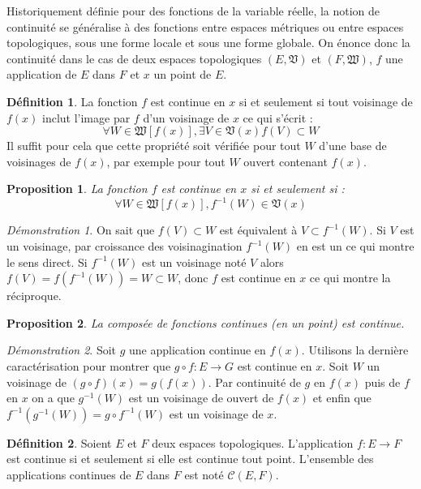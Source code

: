 \documentclass[a4paper, 11pt, french]{book}
\theoremstyle{plain} %
\newtheorem{proposition}{Proposition}
\theoremstyle{definition} %
\newtheorem{definition}{Définition}
\theoremstyle{remark} %
\newtheorem*{demonstration}{Démonstration}
\newcommand{\1}{\mathds{1}}
\newcommand{\inv}[1]{#1^{-1}}
\begin{document}
Historiquement définie pour des fonctions de la variable réelle, la notion de continuité se généralise à des fonctions entre espaces métriques ou entre espaces topologiques, sous une forme locale et sous une forme globale.
On énonce donc la continuité dans le cas de deux espaces topologiques $(E, \mathfrak{V})$ et $(F, \mathfrak{W})$, $f$ une application de $E$ dans $F$ et $x$ un point de $E$.

\begin{definition}
	La fonction $f$ est continue en $x$ si et seulement si tout voisinage de $f(x)$ inclut l'image par $f$ d'un voisinage de $x$ ce qui s'écrit :
	$$
	\forall W\in\mathfrak{W}[f(x)], \exists V\in\mathfrak{V}(x) f(V)\subset W
	$$
	Il suffit pour cela que cette propriété soit vérifiée pour tout $W$ d'une base de voisinages de $f(x)$, par exemple pour tout $W$ ouvert contenant $f(x)$. 
\end{definition}

\begin{proposition}
	La fonction $f$ est continue en $x$ si et seulement si :
	$$
	\forall W\in\mathfrak{W}[f(x)], \inv{f}(W)\in\mathfrak{V}(x)
	$$
\end{proposition}

\begin{demonstration}
	On sait que $f(V)\subset W$ est équivalent à $V\subset\inv{f}(W)$.
	Si $V$ est un voisinage, par croissance des voisinagination $\inv{f}(W)$ en est un ce qui montre le sens direct.
	Si $\inv{f}(W)$ est un voisinage noté $V$ alors $f(V)=f(\inv{f}(W))=W\subset W$, donc $f$ est continue en $x$ ce qui montre la réciproque.
\end{demonstration}

\begin{proposition}
	La composée de fonctions continues (en un point) est continue.
\end{proposition}

\begin{demonstration}
	Soit $g$ une application continue en $f(x)$.
	Utilisons la dernière caractérisation pour montrer que $g\circ f:E\rightarrow G$ est continue en $x$.
	Soit $W$ un voisinage de $(g\circ f)(x)=g(f(x))$.
	Par continuité de $g$ en $f(x)$ puis de $f$ en $x$ on a que $\inv{g}(W)$ est un voisinage de ouvert de $f(x)$ et enfin que $\inv{f}(\inv{g}(W))=\inv{g\circ f}(W)$ est un voisinage de $x$.
\end{demonstration}

\begin{definition}
	Soient $E$ et $F$ deux espaces topologiques.
	L'application $f\colon E\rightarrow F$ est continue si et seulement si elle est continue tout point.
	L'ensemble des applications continues de $E$ dans $F$ est noté $\mathcal{C}(E, F)$.
\end{definition}
\end{document}
